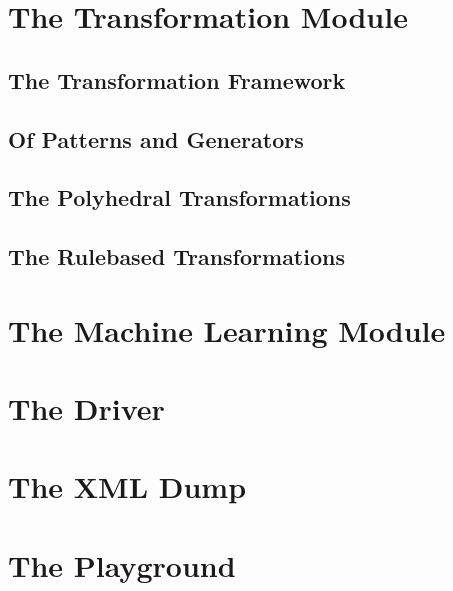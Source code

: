 \section{The Transformation Module}
\subsection{The Transformation Framework}
\subsection{Of Patterns and Generators}
\subsection{The Polyhedral Transformations}
\subsection{The Rulebased Transformations}

\section{The Machine Learning Module}
\section{The Driver}
\section{The XML Dump}
\section{The Playground}
